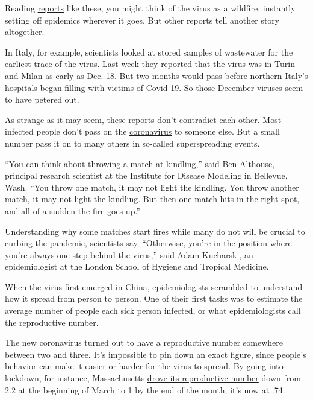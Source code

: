 Reading
\href{https://www.nytimes.com/2020/06/22/us/new-coronavirus-phase.html?action=click\&module=Top\%20Stories\&pgtype=Homepage}{reports}
like these, you might think of the virus as a wildfire, instantly
setting off epidemics wherever it goes. But other reports tell another
story altogether.

In Italy, for example, scientists looked at stored samples of wastewater
for the earliest trace of the virus. Last week they
\href{https://www.thelocal.it/20200619/coronavirus-was-already-in-italy-by-december-waste-water-study-shows}{reported}
that the virus was in Turin and Milan as early as Dec. 18. But two
months would pass before northern Italy's hospitals began filling with
victims of Covid-19. So those December viruses seem to have petered out.

As strange as it may seem, these reports don't contradict each other.
Most infected people don't pass on the
\href{https://www.nytimes.com/2020/07/04/health/239-experts-with-one-big-claim-the-coronavirus-is-airborne.html}{coronavirus}
to someone else. But a small number pass it on to many others in
so-called superspreading events.

``You can think about throwing a match at kindling,'' said Ben Althouse,
principal research scientist at the Institute for Disease Modeling in
Bellevue, Wash. ``You throw one match, it may not light the kindling.
You throw another match, it may not light the kindling. But then one
match hits in the right spot, and all of a sudden the fire goes up.''

Understanding why some matches start fires while many do not will be
crucial to curbing the pandemic, scientists say. ``Otherwise, you're in
the position where you're always one step behind the virus,'' said Adam
Kucharski, an epidemiologist at the London School of Hygiene and
Tropical Medicine.

When the virus first emerged in China, epidemiologists scrambled to
understand how it spread from person to person. One of their first tasks
was to estimate the average number of people each sick person infected,
or what epidemiologists call the reproductive number.

The new coronavirus turned out to have a reproductive number somewhere
between two and three. It's impossible to pin down an exact figure,
since people's behavior can make it easier or harder for the virus to
spread. By going into lockdown, for instance, Massachusetts
\href{https://rt.live/us/MA}{drove its reproductive number} down from
2.2 at the beginning of March to 1 by the end of the month; it's now at
.74.

